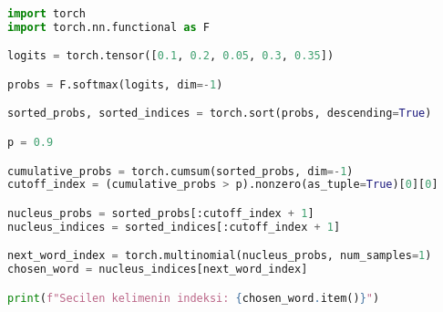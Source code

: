 \begin{lstlisting}[language=Python]
import torch
import torch.nn.functional as F

logits = torch.tensor([0.1, 0.2, 0.05, 0.3, 0.35])

probs = F.softmax(logits, dim=-1)

sorted_probs, sorted_indices = torch.sort(probs, descending=True)

p = 0.9

cumulative_probs = torch.cumsum(sorted_probs, dim=-1)
cutoff_index = (cumulative_probs > p).nonzero(as_tuple=True)[0][0]

nucleus_probs = sorted_probs[:cutoff_index + 1]
nucleus_indices = sorted_indices[:cutoff_index + 1]

next_word_index = torch.multinomial(nucleus_probs, num_samples=1)
chosen_word = nucleus_indices[next_word_index]

print(f"Secilen kelimenin indeksi: {chosen_word.item()}")    
\end{lstlisting}

\newpage